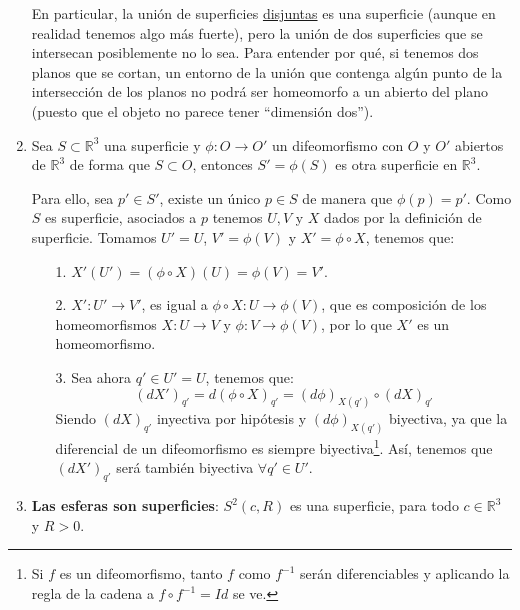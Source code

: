 \begin{ejemplo}
\begin{enumerate}
            En particular, la unión de superficies \underline{disjuntas} es una superficie (aunque en realidad tenemos algo más fuerte), pero la unión de dos superficies que se intersecan posiblemente no lo sea. Para entender por qué, si tenemos dos planos que se cortan, un entorno de la unión que contenga algún punto de la intersección de los planos no podrá ser homeomorfo a un abierto del plano (puesto que el objeto no parece tener ``dimensión dos'').

        \item Sea $S\subset \mathbb{R}^3$ una superficie y $\phi:O\to O'$ un difeomorfismo con $O$ y $O'$ abiertos de $\mathbb{R}^3$ de forma que $S\subset O$, entonces $S' = \phi(S)$ es otra superficie en $\mathbb{R}^3$.

            Para ello, sea $p'\in S'$, existe un único $p\in S$ de manera que $\phi(p) = p'$. Como $S$ es superficie, asociados a $p$ tenemos $U,V$ y $X$ dados por la definición de superficie. Tomamos $U' = U$, $V' = \phi(V)$ y $X' = \phi\circ X$, tenemos que:
            \begin{itemize}
                \item[1.] $X'(U') = (\phi\circ X)(U) = \phi(V) = V'$.
                \item[2.] $X':U'\to V'$, es igual a $\phi\circ X:U\to \phi(V)$, que es composición de los homeomorfismos $X:U\to V$ y $\phi:V\to \phi(V)$, por lo que $X'$ es un homeomorfismo.
                \item[3.] Sea ahora $q'\in U'=U$, tenemos que:
                    \begin{equation*}
                        (dX')_{q'} = d(\phi\circ X)_{q'} = (d\phi)_{X(q')}\circ (dX)_{q'}
                    \end{equation*}
                    Siendo $(dX)_{q'}$ inyectiva por hipótesis y $(d\phi)_{X(q')}$ biyectiva, ya que la diferencial de un difeomorfismo es siempre biyectiva\footnote{Si $f$ es un difeomorfismo, tanto $f$ como $f^{-1}$ serán diferenciables y aplicando la regla de la cadena a $f\circ f^{-1} = Id$ se ve.}. Así, tenemos que $(dX')_{q'}$ será también biyectiva $\forall q'\in U'$.
            \end{itemize}
        \item \textbf{Las esferas son superficies}: $S^2(c,R)$ es una superficie, para todo $c\in \mathbb{R}^3$ y $R>0$.


\end{enumerate}
\end{ejemplo}
